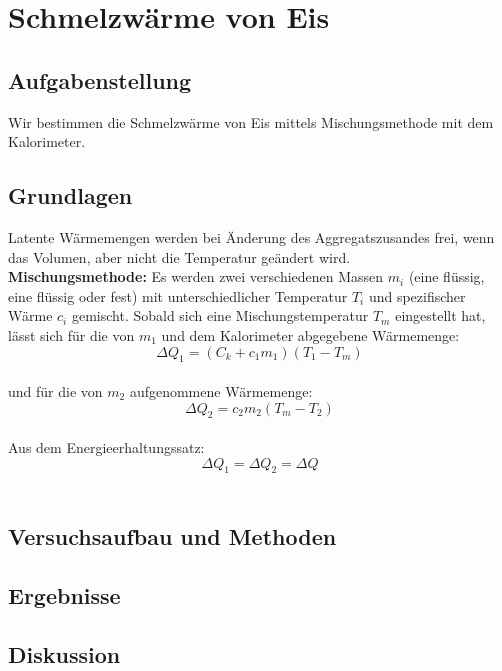 \documentclass{article}
\begin{document}
\section{Schmelzwärme von Eis}
\subsection{Aufgabenstellung}
Wir bestimmen die Schmelzwärme von Eis mittels Mischungsmethode mit dem Kalorimeter.
\subsection{Grundlagen}
Latente Wärmemengen werden bei Änderung des Aggregatszusandes frei, wenn das Volumen, aber nicht die Temperatur geändert wird. \\
\textbf{Mischungsmethode:}
Es werden zwei verschiedenen Massen $m_i$ (eine flüssig, eine flüssig oder fest) mit unterschiedlicher Temperatur $T_i$ und spezifischer Wärme $c_i$ gemischt. Sobald sich eine Mischungstemperatur $T_m$ eingestellt hat, lässt sich für die von $m_1$ und dem Kalorimeter abgegebene Wärmemenge:\\
$$\Delta Q_1=(C_k + c_1m_1)(T_1 - T_m)$$\\
und für die von $m_2$ aufgenommene Wärmemenge: \\
$$\Delta Q_2=c_2m_2(T_m - T_2)$$\\
Aus dem Energieerhaltungssatz: \\
$$\Delta Q_1=\Delta Q_2=\Delta Q$$\\
\subsection{Versuchsaufbau und Methoden}

\subsection{Ergebnisse}
\subsection{Diskussion}
\end{document}

